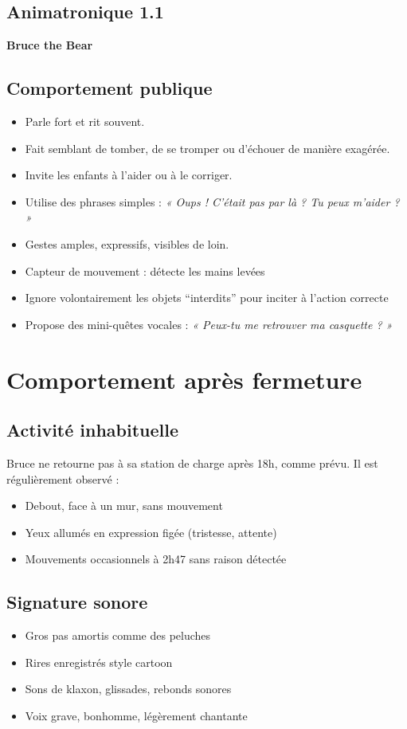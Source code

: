 \subsection{Animatronique 1.1}
\textbf{Bruce the Bear}

\subsection*{Comportement publique}
\begin{itemize}[noitemsep]
  \item Parle fort et rit souvent.
  \item Fait semblant de tomber, de se tromper ou d’échouer de manière exagérée.
  \item Invite les enfants à l’aider ou à le corriger.
  \item Utilise des phrases simples : \textit{« Oups ! C’était pas par là ? Tu peux m’aider ? »}
  \item Gestes amples, expressifs, visibles de loin.
  \item Capteur de mouvement : détecte les mains levées
  \item Ignore volontairement les objets “interdits” pour inciter à l’action correcte
  \item Propose des mini-quêtes vocales : \textit{« Peux-tu me retrouver ma casquette ? »}
\end{itemize}

\section*{Comportement après fermeture}
\subsection*{Activité inhabituelle}
Bruce ne retourne pas à sa station de charge après 18h, comme prévu. Il est régulièrement observé :
\begin{itemize}[noitemsep]
  \item Debout, face à un mur, sans mouvement
  \item Yeux allumés en expression figée (tristesse, attente)
  \item Mouvements occasionnels à 2h47 sans raison détectée
\end{itemize}

\subsection*{Signature sonore}
\begin{itemize}[noitemsep]
  \item Gros pas amortis comme des peluches
  \item Rires enregistrés style cartoon
  \item Sons de klaxon, glissades, rebonds sonores
  \item Voix grave, bonhomme, légèrement chantante
\end{itemize}

